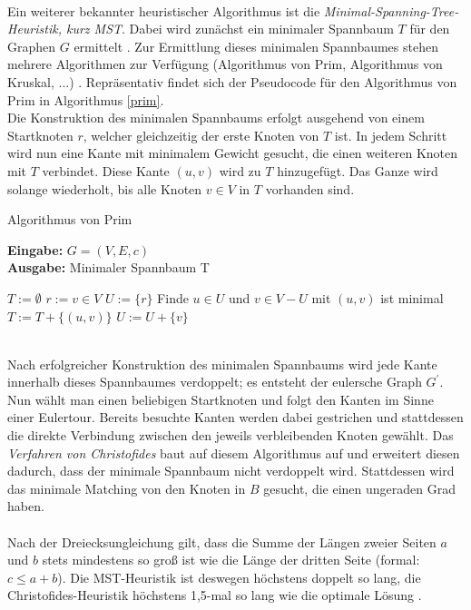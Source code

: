 \documentclass[doktyp=barbeit, sprache=german]{TUBAFarbeiten}
\begin{document}
\\Ein weiterer bekannter heuristischer Algorithmus ist die \textit{Minimal-Spanning-Tree-Heuristik, kurz MST}. Dabei wird zunächst ein minimaler Spannbaum $T$ für den Graphen $G$ ermittelt \cite{Groetschel2005}. Zur Ermittlung dieses minimalen Spannbaumes stehen mehrere Algorithmen zur Verfügung (Algorithmus von Prim, Algorithmus von Kruskal, ...) \cite{MST}. Repräsentativ findet sich der Pseudocode für den Algorithmus von Prim in Algorithmus \ref{prim}. 
\\Die Konstruktion des minimalen Spannbaums erfolgt ausgehend von einem Startknoten $r$, welcher gleichzeitig der erste Knoten von $T$ ist. In jedem Schritt wird nun eine Kante mit minimalem Gewicht gesucht, die einen weiteren Knoten mit $T$ verbindet. Diese Kante $(u,v)$ wird zu $T$ hinzugefügt. Das Ganze wird solange wiederholt, bis alle Knoten $v \in V$ in $T$ vorhanden sind. 
\begin{algorithm}
\caption{Algorithmus von Prim}
\label{prim}
\textbf{Eingabe:} $G = (V,E,c)$
\\\textbf{Ausgabe:} Minimaler Spannbaum T
\begin{algorithmic}[1]
\State $T := \emptyset$
\State $r := v \in V$
\State $U := \{r\}$
\State Finde $u \in U$ und $v \in V - U$ mit $(u,v)$ ist minimal
\State $T := T + \{(u,v)\}$
\State $U := U + \{v\}$
\EndWhile
\end{algorithmic}
\end{algorithm}
\\Nach erfolgreicher Konstruktion des minimalen Spannbaums wird jede Kante innerhalb dieses Spannbaumes verdoppelt; es entsteht der eulersche Graph $G^\prime$. Nun wählt man einen beliebigen Startknoten und folgt den Kanten im Sinne einer Eulertour. Bereits besuchte Kanten werden dabei gestrichen und stattdessen die direkte Verbindung zwischen den jeweils verbleibenden Knoten gewählt. Das \textit{Verfahren von Christofides} baut auf diesem Algorithmus auf und erweitert diesen dadurch, dass der minimale Spannbaum nicht verdoppelt wird. Stattdessen wird das minimale Matching von den Knoten in $B$ gesucht, die einen ungeraden Grad haben. 
\\\\Nach der Dreiecksungleichung gilt, dass die Summe der Längen zweier Seiten $a$ und $b$ stets mindestens so groß ist wie die Länge der dritten Seite (formal: $c \leq a + b$). Die MST-Heuristik ist deswegen höchstens doppelt so lang, die Christofides-Heuristik höchstens 1,5-mal so lang wie die optimale Lösung \cite{Groetschel2005}.
\end{document}
